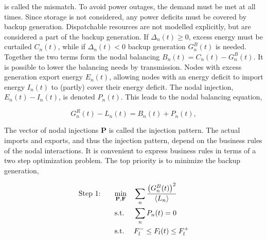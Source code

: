 \documentclass[a4paper, 5p, sort&compress]{elsarticle}%
\newcommand{\mean}[1]{\langle #1 \rangle}
\newcommand{\paren}[1]{\left(#1\right)}
\begin{document}
is called the mismatch. To avoid power outages, the demand must be
met at all times. Since storage is not considered, any power
deficits must be covered by backup generation. Dispatchable
resources are not modelled explicitly, but are considered a part of
the backup generation. If $\Delta_{n}(t) \geq 0$, excess energy must be
curtailed $C_{n}(t)$, while if $\Delta_{n}(t) < 0$ backup generation
$G^{B}_{n}(t)$ is needed. 
Together the two terms form the nodal balancing
$B_{n}(t) = C_{n}(t) - G^{B}_{n}(t)$. 
%
It is possible to lower the balancing needs by transmission. Nodes
with excess generation export energy $E_{n}(t)$, allowing nodes with
an energy deficit to import energy $I_{n}(t)$ to (partly) cover their
energy deficit. The nodal injection, $E_{n}(t) - I_{n}(t)$, is denoted
$P_{n}(t)$. This leads to the nodal balancing equation,

\begin{equation}
  \label{eq:nodal-balancing}
  G^{R}_{n}(t) - L_{n}(t) = B_{n}(t) + P_{n}(t), %
\end{equation}

The vector of nodal injections $\mathbf{P}$ is called the injection
pattern. The actual imports and exports, and thus the injection
pattern, depend on the business rules of the nodal interactions. It is
convenient to express business rules in terms of a two step
optimization problem. The top priority is to minimize the backup
generation,

\begin{equation}
  \label{eq:step1}
  \begin{aligned}
    \text{Step 1: \hspace{15pt}}& \underset{\mathbf{P}, \mathbf{F}}{\text{min}}
    & & \sum_{n} \frac{\paren{G_{n}^{B}(t)}^{2}}{\mean{L_{n}}} \\
    & \text{s.t.}
    & & \sum_{n} P_{n} (t) = 0 \\ %
    & \text{s.t.}
    & & F_{l}^{-} \leq F_{l} (t) \leq F_{l}^{+}
  \end{aligned}
\end{equation}
\end{document}
